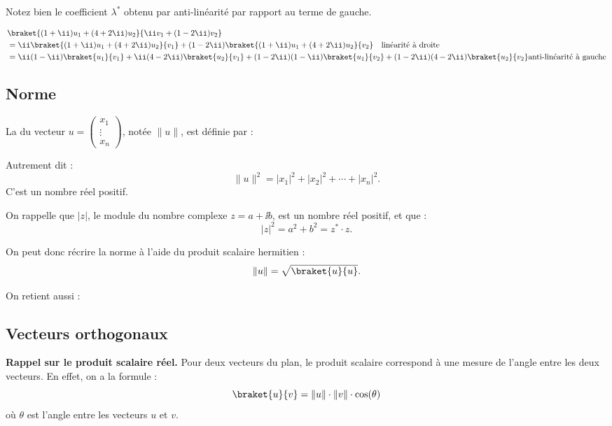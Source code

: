 \documentclass[11pt,class=report,crop=false]{standalone}
\begin{document}
Notez bien le coefficient $\lambda^*$ obtenu par anti-linéarité par rapport au terme de gauche.
\begin{exemple}
\begin{align*}
& \braket{(1+\ii)u_1 + (4+2\ii) u_2}{ \ii v_1 + (1-2\ii) v_2}  \\
  &=  
\ii\braket{(1+\ii)u_1 + (4+2\ii) u_2}{ v_1}
+(1-2\ii)\braket{(1+\ii)u_1 + (4+2\ii) u_2}{v_2} \quad \text{linéarité à droite} \\
  &=  
\ii(1-\ii)\braket{u_1}{v_1}
+\ii(4-2\ii)\braket{u_2}{v_1}
+(1-2\ii)(1-\ii)\braket{u_1}{v_2}
+(1-2\ii)(4-2\ii)\braket{u_2}{v_2}
\text{anti-linéarité à gauche} \\
\end{align*}
\end{exemple}

\subsection{Norme}


La  du vecteur $u = \left(\begin{smallmatrix}x_1\\\vdots\\x_n\end{smallmatrix}\right)$, notée $\|u\|$, est
définie par :

Autrement dit :
$$\|u\|^2 = |x_1|^2 + |x_2|^2 + \cdots + |x_n|^2.$$
C'est un nombre réel positif.


On rappelle que $|z|$, le module du nombre complexe $z=a+\ii b$, est un nombre réel positif, et que :
$$|z|^2 = a^2+b^2 =  z^* \cdot z.$$

On peut donc récrire la norme à l'aide du produit scalaire hermitien :
$$\|u\| = \sqrt{\braket{u}{u}}.$$

On retient aussi :


\subsection{Vecteurs orthogonaux}

\textbf{Rappel sur le produit scalaire réel.}
Pour deux vecteurs du plan, le produit scalaire correspond à une mesure de l'angle entre les deux vecteurs. En effet, on a la formule :
$$\braket{u}{v} = \| u \| \cdot \| v \| \cdot \cos(\theta)$$
où $\theta$ est l'angle entre les vecteurs $u$ et $v$.
\end{document}
